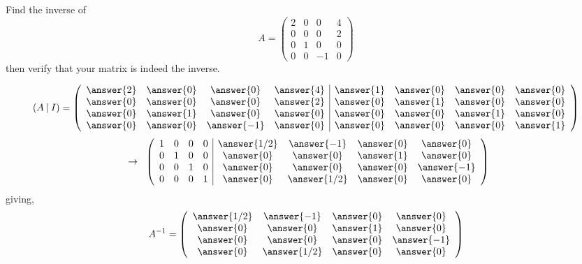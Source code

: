 \documentclass{ximera}
\author{Parisa Fatheddin}
\author{Parisa Fatheddin}
\begin{document}
\begin{exercise}
Find the inverse of
\[A = \left(\begin{array}{cccc}
2 & 0 & 0 & 4\\
0 & 0 &0& 2\\
0& 1 & 0 & 0\\
0 & 0 & -1 & 0
\end{array}\right)
\]
then verify that your matrix is indeed the inverse.

\begin{prompt}
\[(A \hspace{.08cm}| \hspace{.08cm} I)= \left(\begin{array}{cccc|cccc}
\answer{2} & \answer{0} & \answer{0}& \answer{4} & \answer{1} & \answer{0} &\answer{0} & \answer{0}\\
\answer{0} & \answer{0} & \answer{0}& \answer{2} & \answer{0} & \answer{1} &\answer{0} & \answer{0}\\
\answer{0} & \answer{1} & \answer{0}& \answer{0} & \answer{0} & \answer{0} &\answer{1} & \answer{0}\\
\answer{0} & \answer{0} & \answer{-1}& \answer{0} & \answer{0} & \answer{0} &\answer{0} & \answer{1}
\end{array}\right)
\]
\[
\hspace{.2cm} \rightarrow \hspace{.2cm}
\left(\begin{array}{cccc|cccc}
1 & 0 & 0& 0 & \answer{1/2} & \answer{-1} &\answer{0} & \answer{0}\\
0 & 1 & 0& 0 & \answer{0} & \answer{0} &\answer{1} & \answer{0}\\
0 & 0 & 1& 0 & \answer{0} & \answer{0} &\answer{0} & \answer{-1}\\
0 & 0 & 0& 1 & \answer{0} & \answer{1/2} &\answer{0} & \answer{0}
\end{array}\right)
\]
giving,
\[A^{-1} = \left(\begin{array}{cccc}
\answer{1/2} & \answer{-1} &\answer{0} & \answer{0}\\
 \answer{0} & \answer{0} &\answer{1} & \answer{0}\\
 \answer{0} & \answer{0} &\answer{0} & \answer{-1}\\
 \answer{0} & \answer{1/2} &\answer{0} & \answer{0}
\end{array}\right)
\]


\end{prompt}
\end{exercise}
\end{document}
